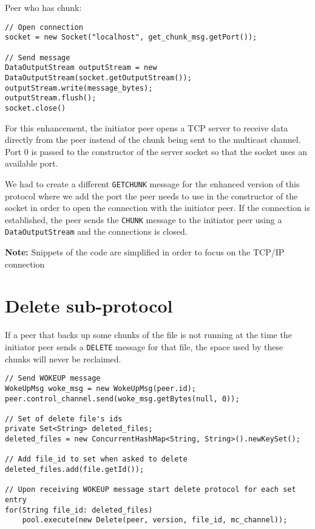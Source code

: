 \documentclass[11pt]{report}
\begin{document}
Peer who has chunk:

\begin{verbatim}
// Open connection
socket = new Socket("localhost", get_chunk_msg.getPort());

// Send message
DataOutputStream outputStream = new DataOutputStream(socket.getOutputStream());
outputStream.write(message_bytes);
outputStream.flush();
socket.close()
\end{verbatim}

For this enhancement, the initiator peer opens a TCP server to receive data directly from the peer instead of the chunk being sent to the multicast channel. Port 0 is passed to the constructor of the server socket so that the socket uses an available port. 

We had to create a different \texttt{GETCHUNK} message for the enhanced version of this protocol where we add the port the peer needs to use in the constructor of the socket in order to open the connection with the initiator peer. If the connection is established, the peer sends the \texttt{CHUNK} message to the initiator peer using a \texttt{DataOutputStream} and the connections is closed. \newline

\textbf{Note:} Snippets of the code are simplified in order to focus on the TCP/IP connection

\newpage

\section{Delete sub-protocol}

If a peer that backs up some chunks of the file is not running at the time the initiator peer sends a \texttt{DELETE} message for that file, the space used by these chunks will never be reclaimed.

\begin{verbatim}
// Send WOKEUP message
WokeUpMsg woke_msg = new WokeUpMsg(peer.id);
peer.control_channel.send(woke_msg.getBytes(null, 0));

// Set of delete file's ids
private Set<String> deleted_files;
deleted_files = new ConcurrentHashMap<String, String>().newKeySet();

// Add file_id to set when asked to delete
deleted_files.add(file.getId());

// Upon receiving WOKEUP message start delete protocol for each set entry
for(String file_id: deleted_files)
    pool.execute(new Delete(peer, version, file_id, mc_channel));
\end{verbatim} 
\end{document}
